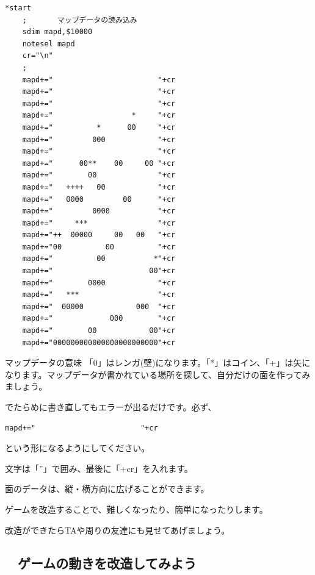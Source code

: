 \begin{lstlisting}[firstnumber=58,caption=jamp.hspのプログラムの一部]
*start
	;       マップデータの読み込み
	sdim mapd,$10000
	notesel mapd
	cr="\n"
	;
	mapd+="                        "+cr
	mapd+="                        "+cr
	mapd+="                        "+cr
	mapd+="                  *     "+cr
	mapd+="          *      00     "+cr
	mapd+="         000            "+cr
	mapd+="                        "+cr
	mapd+="      00**    00     00 "+cr
	mapd+="        00              "+cr
	mapd+="   ++++   00            "+cr
	mapd+="   0000         00      "+cr
	mapd+="         0000           "+cr
	mapd+="     ***                "+cr
	mapd+="++  00000     00   00   "+cr
	mapd+="00          00          "+cr
	mapd+="          00           *"+cr
	mapd+="                      00"+cr
	mapd+="        0000            "+cr
	mapd+="   ***                  "+cr
	mapd+="  00000            000  "+cr
	mapd+="             000        "+cr
	mapd+="        00            00"+cr
	mapd+="000000000000000000000000"+cr
\end{lstlisting}



\begin{itembox}[c]{マップデータの意味}
    「0」はレンガ(壁)になります。「*」はコイン、「+」は矢になります。マップデータが書かれている場所を探して、自分だけの面を作ってみましょう。
\end{itembox}

でたらめに書き直してもエラーが出るだけです。必ず、

\begin{lstlisting}[numbers=none]
	mapd+="                        "+cr
\end{lstlisting}

という形になるようにしてください。

文字は「”」で囲み、最後に「+cr」を入れます。

面のデータは、縦・横方向に広げることができます。


\exampleanswer

ゲームを改造することで、難しくなったり、簡単になったりします。

改造ができたらTAや周りの友達にも見せてあげましょう。

\newpage
\subsection{\useOmetoiExample　ゲームの動きを改造してみよう}

\exampleinduction



